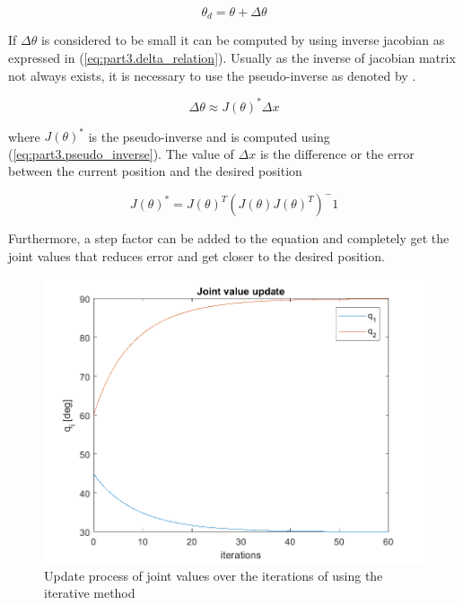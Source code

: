 \documentclass{article}
\begin{document}
\begin{equation}
\theta_d=\theta+\Delta\theta
\end{equation}

If $\Delta\theta$ is considered to be small it can be computed by using inverse jacobian as expressed in (\ref{eq:part3.delta_relation}). Usually as the inverse of jacobian matrix not always exists, it is necessary to use the pseudo-inverse as denoted by \citep{penrose1955generalized}.

\begin{equation}
\label{eq:part3.delta_relation}
\Delta\theta \approx  J(\theta)^{*}\Delta x
\end{equation}

where $J(\theta)^{*}$ is the pseudo-inverse and is computed using (\ref{eq:part3.pseudo_inverse}). The value of $\Delta x$ is the difference or the error between the current position and the desired position 

\begin{equation}
\label{eq:part3.pseudo_inverse}
J(\theta)^{*} = J(\theta)^T(J(\theta)J(\theta)^T)^-1
\end{equation}

Furthermore, a step factor can be added to the equation and completely get the joint values that reduces error and get closer to the desired position.

\begin{figure}[htbp] 
\begin{center}
\includegraphics[width=\textwidth]{images/Trajectory_Joint_p3_rodrigo}
\caption{Update process of joint values over the iterations of using the iterative method}
\label{fig:part3.joint_trajectory}
\end{center}
\end{figure}
\end{document}
